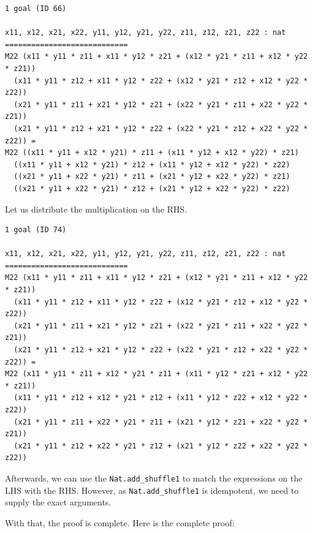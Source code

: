 \documentclass{article}
\begin{document}
\begin{lstlisting}
1 goal (ID 66)

x11, x12, x21, x22, y11, y12, y21, y22, z11, z12, z21, z22 : nat
============================
M22 (x11 * y11 * z11 + x11 * y12 * z21 + (x12 * y21 * z11 + x12 * y22 * z21))
  (x11 * y11 * z12 + x11 * y12 * z22 + (x12 * y21 * z12 + x12 * y22 * z22))
  (x21 * y11 * z11 + x21 * y12 * z21 + (x22 * y21 * z11 + x22 * y22 * z21))
  (x21 * y11 * z12 + x21 * y12 * z22 + (x22 * y21 * z12 + x22 * y22 * z22)) =
M22 ((x11 * y11 + x12 * y21) * z11 + (x11 * y12 + x12 * y22) * z21)
  ((x11 * y11 + x12 * y21) * z12 + (x11 * y12 + x12 * y22) * z22)
  ((x21 * y11 + x22 * y21) * z11 + (x21 * y12 + x22 * y22) * z21)
  ((x21 * y11 + x22 * y21) * z12 + (x21 * y12 + x22 * y22) * z22)
\end{lstlisting}

Let us distribute the multiplication on the RHS.

\begin{lstlisting}
1 goal (ID 74)

x11, x12, x21, x22, y11, y12, y21, y22, z11, z12, z21, z22 : nat
============================
M22 (x11 * y11 * z11 + x11 * y12 * z21 + (x12 * y21 * z11 + x12 * y22 * z21))
  (x11 * y11 * z12 + x11 * y12 * z22 + (x12 * y21 * z12 + x12 * y22 * z22))
  (x21 * y11 * z11 + x21 * y12 * z21 + (x22 * y21 * z11 + x22 * y22 * z21))
  (x21 * y11 * z12 + x21 * y12 * z22 + (x22 * y21 * z12 + x22 * y22 * z22)) =
M22 (x11 * y11 * z11 + x12 * y21 * z11 + (x11 * y12 * z21 + x12 * y22 * z21))
  (x11 * y11 * z12 + x12 * y21 * z12 + (x11 * y12 * z22 + x12 * y22 * z22))
  (x21 * y11 * z11 + x22 * y21 * z11 + (x21 * y12 * z21 + x22 * y22 * z21))
  (x21 * y11 * z12 + x22 * y21 * z12 + (x21 * y12 * z22 + x22 * y22 * z22))
\end{lstlisting}

Afterwards, we can use the \texttt{Nat.add\_shuffle1} to match the expressions on the LHS with the RHS. However, as \texttt{Nat.add\_shuffle1} is idempotent, we need to supply the exact arguments.

With that, the proof is complete. Here is the complete proof:
\end{document}
